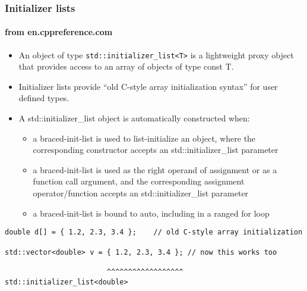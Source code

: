 \begin{frame}[fragile,t]
\frametitle{Initializer lists}
\framesubtitle{from en.cppreference.com}
\begin{itemize}[<+->]
\item An object of type \texttt{std::initializer\_list<T>} is a lightweight proxy object that provides access to an array of objects of type const T. 
\item Initializer lists provide ``old C-style array initialization  syntax'' for user defined types.
\item A std::initializer\_list object is automatically constructed when:
  \begin{itemize}
  \item a braced-init-list is used to list-initialize an object, where the corresponding constructor accepts an std::initializer\_list parameter
  \item a braced-init-list is used as the right operand of assignment or as a function call argument, and the corresponding assignment operator/function accepts an std::initializer\_list parameter
  \item a braced-init-list is bound to auto, including in a ranged for loop 
  \end{itemize}
\end{itemize}
\pause{}
{\scriptsize\begin{verbatim}
double d[] = { 1.2, 2.3, 3.4 };    // old C-style array initialization

std::vector<double> v = { 1.2, 2.3, 3.4 }; // now this works too

                        ^^^^^^^^^^^^^^^^^^ std::initializer_list<double>
\end{verbatim}}
\end{frame}



